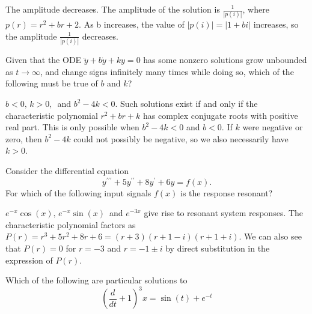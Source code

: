 The amplitude decreases.
The amplitude of the solution is $\frac{1}{|p(i)|}$, where $p(r)=r^2+br+2$.
As b increases, the value of $|p(i)|=|1+bi|$ increases,
so the amplitude $\frac{1}{|p(i)|}$ decreases.

\begin{homework}
  Given that the ODE $\ddot y+ b \dot y + ky=0$ has
  some nonzero solutions grow unbounded as $t \to \infty$,
  and change signs infinitely many times while doing so,
  which of the following must be true of $b$ and $k$?
\end{homework}
$b < 0,\, k>0,\,$  and $b^2−4k<0$. 
Such solutions exist if and only if the characteristic polynomial $r^2+br+k$ has complex conjugate roots with positive real part.
This is only possible when $b^2−4k<0$ and $b<0$. 
If $k$ were negative or zero, then $b^2−4k$ could not possibly be negative,
so we also necessarily have $k>0$.

\begin{homework}
  Consider the differential equation
  \begin{equation*}
    \displaystyle  y^{\prime \prime \prime } +5y^{\prime \prime } + 8y^{\prime } +6y = f(x).
  \end{equation*}
  For which of the following input signals $f(x)$ is the response resonant?
\end{homework}

$e^{-x}\cos (x),\, e^{-x}\sin (x)\, $ and $e^{-3x}$ give rise to resonant system responses.
The characteristic polynomial factors as $P(r)=r^3+5r^2+8r+6=(r+3)(r+1−i)(r+1+i)$.
We can also see that $P(r)=0$ for $r=−3$ and $r=−1 \pm i$
by direct substitution in the expression of $P(r)$.

\begin{homework}
  Which of the following are particular solutions to
  \begin{equation*}
    \displaystyle  \left(\frac{d}{dt} + 1\right)^3x = \sin (t) + e^{-t}
  \end{equation*}
 \end{homework}

